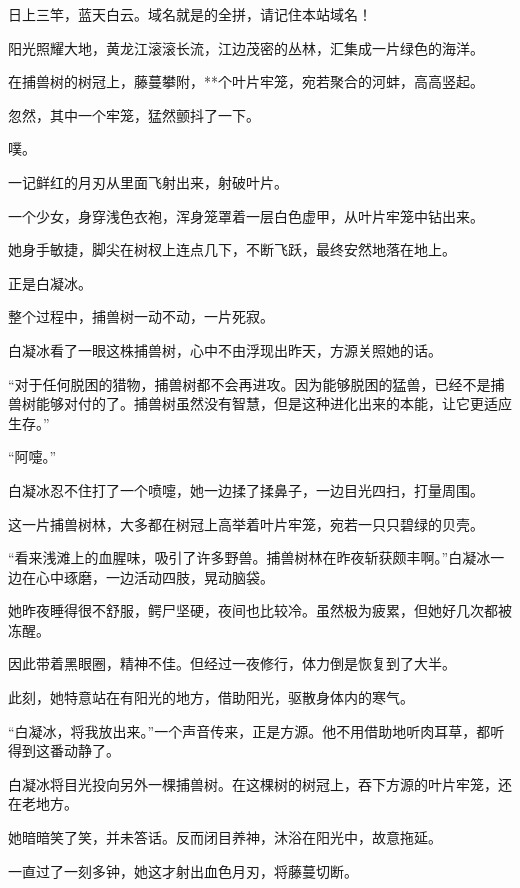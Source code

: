 
\begin{this_body}

日上三竿，蓝天白云。域名就是的全拼，请记住本站域名！

阳光照耀大地，黄龙江滚滚长流，江边茂密的丛林，汇集成一片绿色的海洋。

在捕兽树的树冠上，藤蔓攀附，**个叶片牢笼，宛若聚合的河蚌，高高竖起。

忽然，其中一个牢笼，猛然颤抖了一下。

噗。

一记鲜红的月刃从里面飞射出来，射破叶片。

一个少女，身穿浅色衣袍，浑身笼罩着一层白色虚甲，从叶片牢笼中钻出来。

她身手敏捷，脚尖在树杈上连点几下，不断飞跃，最终安然地落在地上。

正是白凝冰。

整个过程中，捕兽树一动不动，一片死寂。

白凝冰看了一眼这株捕兽树，心中不由浮现出昨天，方源关照她的话。

“对于任何脱困的猎物，捕兽树都不会再进攻。因为能够脱困的猛兽，已经不是捕兽树能够对付的了。捕兽树虽然没有智慧，但是这种进化出来的本能，让它更适应生存。”

“阿嚏。”

白凝冰忍不住打了一个喷嚏，她一边揉了揉鼻子，一边目光四扫，打量周围。

这一片捕兽树林，大多都在树冠上高举着叶片牢笼，宛若一只只碧绿的贝壳。

“看来浅滩上的血腥味，吸引了许多野兽。捕兽树林在昨夜斩获颇丰啊。”白凝冰一边在心中琢磨，一边活动四肢，晃动脑袋。

她昨夜睡得很不舒服，鳄尸坚硬，夜间也比较冷。虽然极为疲累，但她好几次都被冻醒。

因此带着黑眼圈，精神不佳。但经过一夜修行，体力倒是恢复到了大半。

此刻，她特意站在有阳光的地方，借助阳光，驱散身体内的寒气。

“白凝冰，将我放出来。”一个声音传来，正是方源。他不用借助地听肉耳草，都听得到这番动静了。

白凝冰将目光投向另外一棵捕兽树。在这棵树的树冠上，吞下方源的叶片牢笼，还在老地方。

她暗暗笑了笑，并未答话。反而闭目养神，沐浴在阳光中，故意拖延。

一直过了一刻多钟，她这才射出血色月刃，将藤蔓切断。


\end{this_body}
